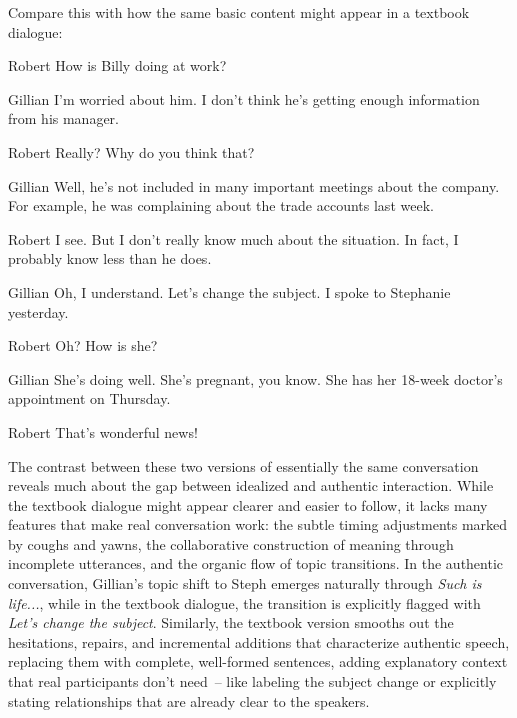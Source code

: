 Compare this with how the same basic content might appear in a textbook dialogue:

\ea
\begin{dialogue}
\item[Robert] How is Billy doing at work?

\item[Gillian] I'm worried about him. I don't think he's getting enough information from his manager.

\item[Robert] Really? Why do you think that?

\item[Gillian] Well, he's not included in many important meetings about the company. For example, he was complaining about the trade accounts last week.

\item[Robert] I see. But I don't really know much about the situation. In fact, I probably know less than he does.

\item[Gillian] Oh, I understand. Let's change the subject. I spoke to Stephanie yesterday.

\item[Robert] Oh? How is she?

\item[Gillian] She's doing well. She's pregnant, you know. She has her 18-week doctor's appointment on Thursday.

\item[Robert] That's wonderful news!
\end{dialogue}
\z

The contrast between these two versions of essentially the same conversation reveals much about the gap between idealized and authentic interaction. While the textbook dialogue might appear clearer and easier to follow, it lacks many features that make real conversation work: the subtle timing adjustments marked by coughs and yawns, the collaborative construction of meaning through incomplete utterances, and the organic flow of topic transitions. In the authentic conversation, Gillian's topic shift to Steph emerges naturally through \textit{Such is life...}, while in the textbook dialogue, the transition is explicitly flagged with \textit{Let's change the subject}. Similarly, the textbook version smooths out the hesitations, repairs, and incremental additions that characterize authentic speech, replacing them with complete, well-formed sentences, adding explanatory context that real participants don't need~-- like labeling the subject change or explicitly stating relationships that are already clear to the speakers.

